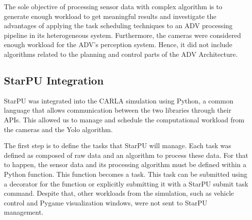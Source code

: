 \documentclass[conference]{IEEEtran}
\begin{document}



The sole objective of processing sensor data with complex algorithm is to generate enough workload to get meaningful results and investigate the advantages of applying the task scheduling techniques to an ADV processing pipeline in its heterogeneous system. Furthermore, the cameras were considered enough workload for the ADV's perception system. Hence, it did not include algorithms related to the planning and control parts of the ADV Architecture\cite{Silva2024}.

\subsection{StarPU Integration}
StarPU was integrated into the CARLA simulation using Python, a common language that allows communication between the two libraries through their APIs. This allowed us to manage and schedule the computational workload from the cameras and the Yolo algorithm. %

The first step is to define the tasks that StarPU will manage. Each task was defined as composed of raw data and an algorithm to process these data. For that to happen, the sensor data and its processing algorithm must be defined within a Python function. This function becomes a task. This task can be submitted using a decorator for the function or explicitly submitting it with a StarPU submit task command. Despite that, other workloads from the simulation, such as vehicle control and Pygame visualization windows, were not sent to StarPU management.
\end{document}
